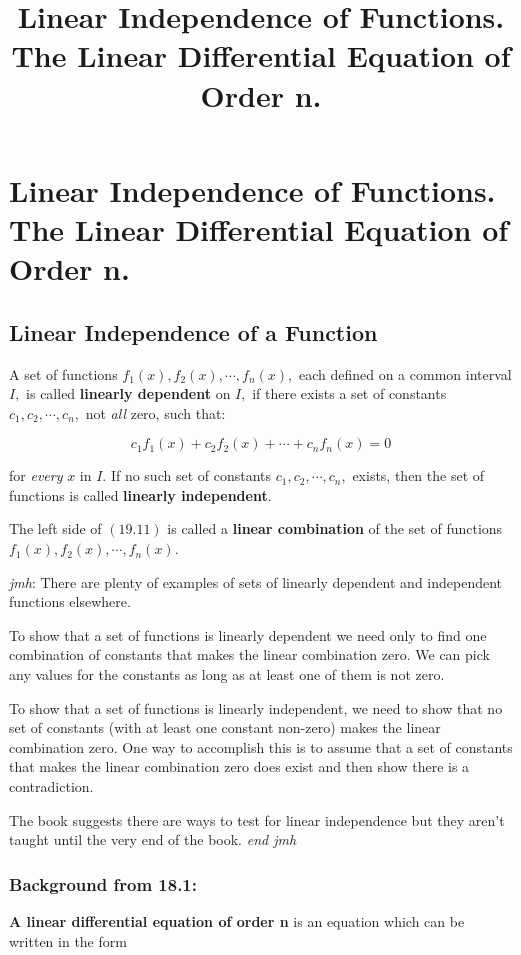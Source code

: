 \documentclass{article}
\title{Linear Independence of Functions. The Linear Differential Equation of Order n.}
\begin{document}
\section{Linear Independence of Functions. The Linear Differential Equation of Order n.}

\subsection{Linear Independence of a Function}

A set of functions $f_1(x), f_2(x),\cdots,f_n(x),$ each defined on a common interval $I,$ is called \textbf{linearly dependent} on $I,$ if there exists a set of constants $c_1,c_2,\cdots,c_n,$ not \emph{all} zero, such that:

\[ \tag{19.11} c_1f_1(x) + c_2f_2(x) + \cdots + c_nf_n(x) = 0 \]

for \emph{every} $x$ in $I$. If no such set of constants $c_1,c_2,\cdots,c_n,$ exists, then the set of functions is called \textbf{linearly independent}.

The left side of $(19.11)$ is called a \textbf{linear combination} of the set of functions $f_1(x), f_2(x),\cdots,f_n(x).$

\emph{jmh}: There are plenty of examples of sets of linearly dependent and independent functions elsewhere.

To show that a set of functions is linearly dependent we need only to find one combination of constants that makes the linear combination zero. We can pick any values for the constants as long as at least one of them is not zero.

To show that a set of functions is linearly independent, we need to show that no set of constants (with at least one constant non-zero) makes the linear combination zero. One way to accomplish this is to assume that a set of constants that makes the linear combination zero does exist and then show there is a contradiction.

The book suggests there are ways to test for linear independence but they aren't taught until the very end of the book. \emph{end jmh}

\subsubsection{Background from  18.1:}

\textbf{A linear differential equation of order n} is an equation which can be written in the form
\end{document}
